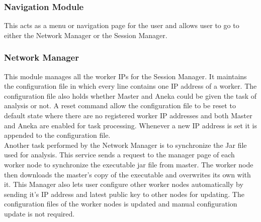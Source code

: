 \documentclass[10pt,journal,compsoc]{IEEEtran}
\begin{document}
\subsubsection{Navigation Module}
This acts as a menu or navigation page for the user and allows user to go to either the Network Manager or the Session Manager.

\subsubsection{Network Manager}
This module manages all the worker IPs for the Session Manager. It maintains the configuration file in which every line contains one IP address of a worker. The configuration file also holds whether Master and Aneka could be given the task of analysis or not. A reset command allow the configuration file to be reset to default state where there are no registered worker IP addresses and both Master and Aneka are enabled for task processing. 
Whenever a new IP address is set it is appended to the configuration file. \\
Another task performed by the Network Manager is to synchronize the Jar file used for analysis. This service sends a request to the manager page of each worker node to synchronize the executable jar file from master. The worker node then downloads the master’s copy of the executable and overwrites its own with it. 
This Manager also lets user configure other worker nodes automatically by sending it’s IP address and latest public key to other nodes for updating. The configuration files of the worker nodes is updated and manual configuration update is not required.
\end{document}
